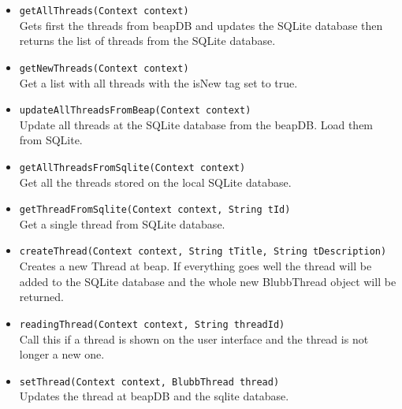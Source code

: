 \documentclass[12pt,a4paper,oneside]{report}
\newcommand{\code}[1]{\lstinline{#1}}
\begin{document}
\begin{itemize}
\item{\code{getAllThreads(Context context)}}\\
Gets first the threads from beapDB and updates the SQLite database then returns the list of threads from the SQLite database.

\item{\code{getNewThreads(Context context)}}\\
Get a list with all threads with the isNew tag set to true.
 
\item{\code{updateAllThreadsFromBeap(Context context)}}\\
Update all threads at the SQLite database from the beapDB. Load them from SQLite.

\item{\code{getAllThreadsFromSqlite(Context context)}}\\
Get all the threads stored on the local SQLite database.

\item{\code{getThreadFromSqlite(Context context, String tId)}}\\
Get a single thread from SQLite database.

\item{\code{createThread(Context context, String tTitle, String tDescription)}}\\
Creates a new Thread at beap. If everything goes well the thread will be added to the SQLite database and the whole new BlubbThread object will be returned.

\item{\code{readingThread(Context context, String threadId)}}\\
Call this if a thread is shown on the user interface and the thread is not longer a new one.

\item{\code{setThread(Context context, BlubbThread thread)}}\\
Updates the thread at beapDB and the sqlite database.

\end{itemize}
\end{document}
